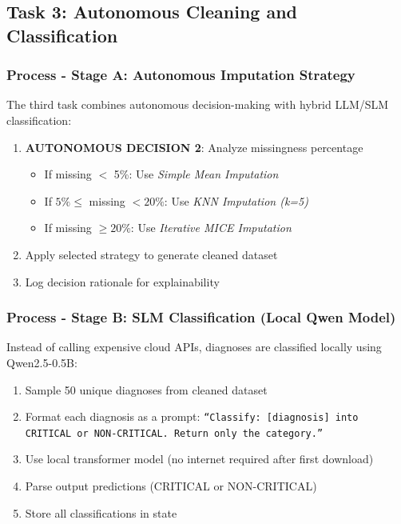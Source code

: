 \documentclass[10pt,a4paper]{article}
\begin{document}
\subsection{Task 3: Autonomous Cleaning and Classification}

\subsubsection{Process - Stage A: Autonomous Imputation Strategy}

The third task combines autonomous decision-making with hybrid LLM/SLM classification:

\begin{enumerate}
    \item \textbf{AUTONOMOUS DECISION 2}: Analyze missingness percentage
    \begin{itemize}
        \item If missing $<$ 5\%: Use \textit{Simple Mean Imputation}
        \item If $5\% \leq$ missing $< 20\%$: Use \textit{KNN Imputation (k=5)}
        \item If missing $\geq 20\%$: Use \textit{Iterative MICE Imputation}
    \end{itemize}
    \item Apply selected strategy to generate cleaned dataset
    \item Log decision rationale for explainability
\end{enumerate}

\subsubsection{Process - Stage B: SLM Classification (Local Qwen Model)}

Instead of calling expensive cloud APIs, diagnoses are classified locally using Qwen2.5-0.5B:

\begin{enumerate}
    \item Sample 50 unique diagnoses from cleaned dataset
    \item Format each diagnosis as a prompt: \texttt{``Classify: [diagnosis] into CRITICAL or NON-CRITICAL. Return only the category.''}
    \item Use local transformer model (no internet required after first download)
    \item Parse output predictions (CRITICAL or NON-CRITICAL)
    \item Store all classifications in state
\end{enumerate}
\end{document}

